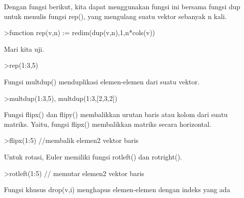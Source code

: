 \documentclass{article}
\newenvironment{eulernotebook}{\par}{\par}
\newenvironment{eulercomment}{\par\medskip}{\par\medskip}
\begin{document}
\begin{eulernotebook}
\begin{eulercomment}
\begin{eulercomment}
\begin{eulercomment}
\begin{eulercomment}
\begin{eulercomment}
\begin{eulercomment}
\begin{eulercomment}
Dengan fungsi berikut, kita dapat menggunakan fungsi ini bersama
fungsi dup untuk menulis fungsi rep(), yang mengulang suatu vektor
sebanyak n kali.
\end{eulercomment}
\begin{eulerprompt}
>function rep(v,n) := redim(dup(v,n),1,n*cols(v))
\end{eulerprompt}
\begin{eulercomment}
Mari kita uji.
\end{eulercomment}
\begin{eulerprompt}
>rep(1:3,5)
\end{eulerprompt}
\begin{euleroutput}
  [1,  2,  3,  1,  2,  3,  1,  2,  3,  1,  2,  3,  1,  2,  3]
\end{euleroutput}
\begin{eulercomment}
Fungsi multdup() menduplikasi elemen-elemen dari suatu vektor.
\end{eulercomment}
\begin{eulerprompt}
>multdup(1:3,5), multdup(1:3,[2,3,2])
\end{eulerprompt}
\begin{euleroutput}
  [1,  1,  1,  1,  1,  2,  2,  2,  2,  2,  3,  3,  3,  3,  3]
  [1,  1,  2,  2,  2,  3,  3]
\end{euleroutput}
\begin{eulercomment}
Fungsi flipx() dan flipy() membalikkan urutan baris atau kolom dari
suatu matriks. Yaitu, fungsi flipx() membalikkan matriks secara
horizontal.
\end{eulercomment}
\begin{eulerprompt}
>flipx(1:5) //membalik elemen2 vektor baris
\end{eulerprompt}
\begin{euleroutput}
  [5,  4,  3,  2,  1]
\end{euleroutput}
\begin{eulercomment}
Untuk rotasi, Euler memiliki fungsi rotleft() dan rotright().
\end{eulercomment}
\begin{eulerprompt}
>rotleft(1:5) // memutar elemen2 vektor baris
\end{eulerprompt}
\begin{euleroutput}
  [2,  3,  4,  5,  1]
\end{euleroutput}
\begin{eulercomment}
Fungsi khusus drop(v,i) menghapus elemen-elemen dengan indeks yang ada

\end{eulercomment}
\end{eulercomment}
\end{eulercomment}
\end{eulercomment}
\end{eulercomment}
\end{eulercomment}
\end{eulercomment}
\end{eulernotebook}
\end{document}
